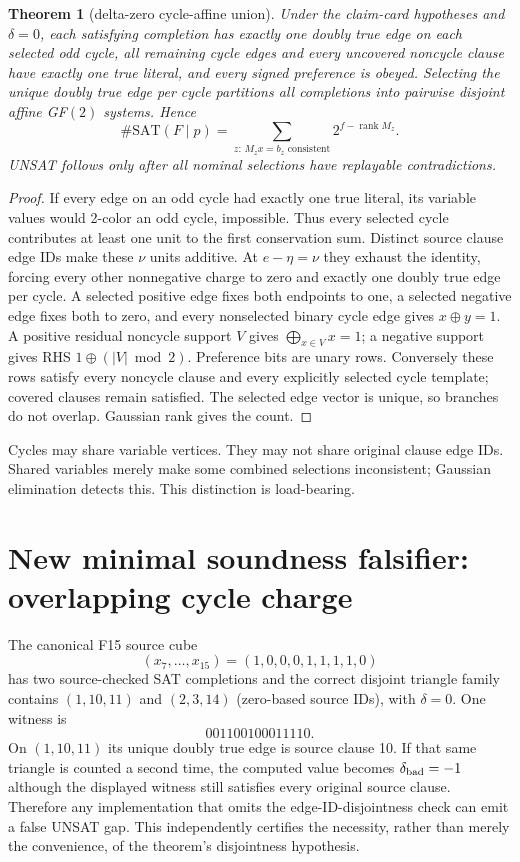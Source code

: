 \documentclass[11pt]{article}
\newtheorem{theorem}{Theorem}
\begin{document}
\begin{theorem}[delta-zero cycle-affine union]
Under the claim-card hypotheses and $\delta=0$, each satisfying completion
has exactly one doubly true edge on each selected odd cycle, all remaining
cycle edges and every uncovered noncycle clause have exactly one true
literal, and every signed preference is obeyed.  Selecting the unique doubly
true edge per cycle partitions all completions into pairwise disjoint affine
GF$(2)$ systems.  Hence
\[
 \#\mathrm{SAT}(F\mid p)=
 \sum_{z:\,M_zx=b_z\text{ consistent}}2^{f-\operatorname{rank}M_z}.
\]
UNSAT follows only after all nominal selections have replayable contradictions.
\end{theorem}
\begin{proof}
If every edge on an odd cycle had exactly one true literal, its variable
values would 2-color an odd cycle, impossible.  Thus every selected cycle
contributes at least one unit to the first conservation sum.  Distinct source
clause edge IDs make these $\nu$ units additive.  At $e-\eta=\nu$ they exhaust
the identity, forcing every other nonnegative charge to zero and exactly one
doubly true edge per cycle.  A selected positive edge fixes both endpoints to
one, a selected negative edge fixes both to zero, and every nonselected
binary cycle edge gives $x\oplus y=1$.  A positive residual noncycle support
$V$ gives $\bigoplus_{x\in V}x=1$; a negative support gives RHS
$1\oplus(|V|\bmod2)$.  Preference bits are unary rows.  Conversely these
rows satisfy every noncycle clause and every explicitly selected cycle
template; covered clauses remain satisfied.  The selected edge vector is
unique, so branches do not overlap.  Gaussian rank gives the count.
\end{proof}

Cycles may share variable vertices.  They may not share original clause edge
IDs.  Shared variables merely make some combined selections inconsistent;
Gaussian elimination detects this.  This distinction is load-bearing.

\section{New minimal soundness falsifier: overlapping cycle charge}
The canonical F15 source cube
\[
(x_7,\ldots,x_{15})=(1,0,0,0,1,1,1,1,0)
\]
has two source-checked SAT completions and the correct disjoint triangle family
contains $(1,10,11)$ and $(2,3,14)$ (zero-based source IDs), with $\delta=0$.
One witness is
\[
001100100011110.
\]
On $(1,10,11)$ its unique doubly true edge is source clause 10.  If that same
triangle is counted a second time, the computed value becomes
$\delta_{\rm bad}=-1$ although the displayed witness still satisfies every
original source clause.  Therefore any implementation that omits the
edge-ID-disjointness check can emit a false UNSAT gap.  This independently
certifies the necessity, rather than merely the convenience, of the theorem's
disjointness hypothesis.
\end{document}
